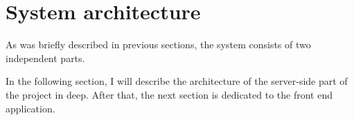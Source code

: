 \section{System architecture}\label{sec:system-architecture}

As was briefly described in previous sections, the system consists of two independent parts.

In the following section, I will describe the architecture of the server-side part of the project in deep.
After that, the next section is dedicated to the front end application.
